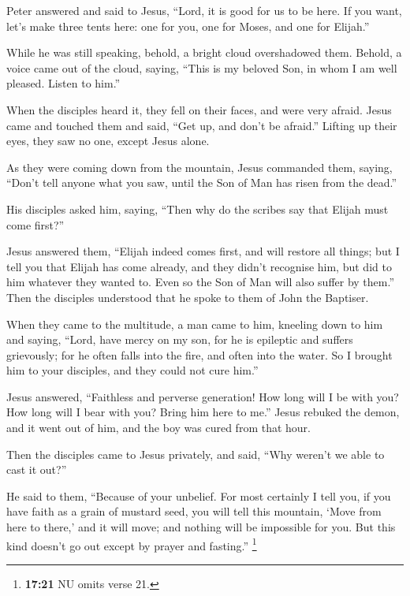  Peter answered and said to Jesus, ``Lord, it is good for
us to be here. If you want, let's make three tents here: one for you,
one for Moses, and one for Elijah.''

 While he was still speaking, behold, a bright cloud
overshadowed them. Behold, a voice came out of the cloud, saying, ``This
is my beloved Son, in whom I am well pleased. Listen to him.''

 When the disciples heard it, they fell on their faces,
and were very afraid.  Jesus came and touched them and
said, ``Get up, and don't be afraid.''  Lifting up their
eyes, they saw no one, except Jesus alone.

 As they were coming down from the mountain, Jesus
commanded them, saying, ``Don't tell anyone what you saw, until the Son
of Man has risen from the dead.''

 His disciples asked him, saying, ``Then why do the
scribes say that Elijah must come first?''

 Jesus answered them, ``Elijah indeed comes first, and
will restore all things;  but I tell you that Elijah has
come already, and they didn't recognise him, but did to him whatever
they wanted to. Even so the Son of Man will also suffer by them.''
 Then the disciples understood that he spoke to them of
John the Baptiser.

 When they came to the multitude, a man came to him,
kneeling down to him and saying,  ``Lord, have mercy on
my son, for he is epileptic and suffers grievously; for he often falls
into the fire, and often into the water.  So I brought
him to your disciples, and they could not cure him.''

 Jesus answered, ``Faithless and perverse generation! How
long will I be with you? How long will I bear with you? Bring him here
to me.''  Jesus rebuked the demon, and it went out of
him, and the boy was cured from that hour.

 Then the disciples came to Jesus privately, and said,
``Why weren't we able to cast it out?''

 He said to them, ``Because of your unbelief. For most
certainly I tell you, if you have faith as a grain of mustard seed, you
will tell this mountain, `Move from here to there,' and it will move;
and nothing will be impossible for you.  But this kind
doesn't go out except by prayer and fasting.'' \footnote{\textbf{17:21}
  NU omits verse 21.}

